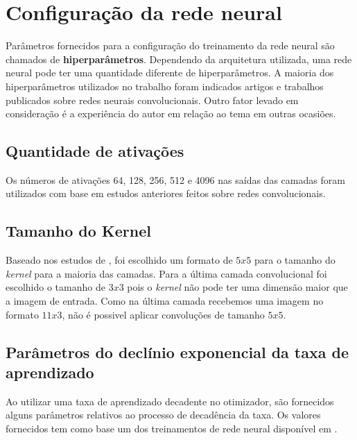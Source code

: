 \section{Configuração da rede neural}

Parâmetros fornecidos para a configuração do treinamento da rede
neural são chamados de {\bf hiperparâmetros}. Dependendo da
arquitetura utilizada, uma rede neural pode ter uma quantidade
diferente de hiperparâmetros. A maioria dos hiperparâmetros utilizados
no trabalho foram indicados artigos e trabalhos publicados sobre redes
neurais convolucionais. Outro fator levado em consideração é a
experiência do autor em relação ao tema em outras ocasiões.

\subsection{Quantidade de ativações}

Os números de ativações 64, 128, 256, 512 e 4096 nas saídas das
camadas foram utilizados com base em estudos anteriores feitos sobre
redes convolucionais\cite{Krizhevsky}.

\subsection{Tamanho do Kernel}

Baseado nos estudos de \cite{Goodfellow}, foi escolhido um formato
de $5x5$ para o tamanho do \textit{kernel} para a maioria das
camadas. Para a última camada convolucional foi escolhido o tamanho
de $3x3$ pois o \textit{kernel} não pode ter uma dimensão maior que
a imagem de entrada. Como na última camada recebemos uma imagem no
formato $11x3$, não é possivel aplicar convoluções de tamanho $5x5$.

\subsection{Parâmetros do declínio exponencial da taxa de aprendizado}

Ao utilizar uma taxa de aprendizado decadente no otimizador, são
fornecidos alguns parâmetros relativos ao processo de decadência da
taxa. Os valores fornecidos tem como base um dos treinamentos de rede
neural disponível em \cite{tensorCode}.


